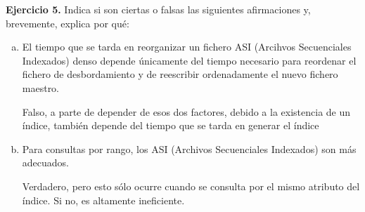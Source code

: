 \documentclass[12pt]{report}
\begin{document}
\textbf{Ejercicio 5.} Indica si son ciertas o falsas las siguientes afirmaciones y, brevemente, explica por qué:
\begin{enumerate}[(a)]
\item El tiempo que se tarda en reorganizar un fichero ASI (Arcihvos Secuenciales Indexados) denso depende únicamente del tiempo necesario para reordenar el fichero de desbordamiento y de reescribir ordenadamente el nuevo fichero maestro.

Falso, a parte de depender de esos dos factores, debido a la existencia de un índice, también depende del tiempo que se tarda en generar el índice

\item Para consultas por rango, los ASI (Archivos Secuenciales Indexados) son más adecuados.

Verdadero, pero esto sólo ocurre cuando se consulta por el mismo atributo del índice. Si no, es altamente ineficiente.
\end{enumerate} 
\end{document}
